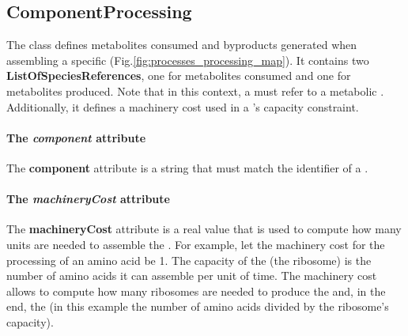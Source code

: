 \subsection{ComponentProcessing}
\label{sec:component_processing}

The \componentprocessing{} class defines metabolites consumed and byproducts
generated when assembling a specific \component{}
(Fig.\ref{fig:processes_processing_map}).
It contains two \textbf{ListOfSpeciesReferences}, one for metabolites
consumed and one for metabolites produced.
Note that in this context, a \speciesreference{} must refer to a
metabolic \species.
Additionally, it defines a machinery cost used in a \machinery{}'s
capacity constraint.

\paragraph{The \textit{component} attribute}
The \textbf{component} attribute is a string that must match the identifier
of a \component{}.

\paragraph{The \textit{machineryCost} attribute}
The \textbf{machineryCost} attribute is a real value that is used to
compute how many \machinery{} units are needed to assemble the \component{}.
For example, let the machinery cost for the processing of an amino acid be 1.
The capacity of the \machinery{} (the ribosome) is the number of amino acids
it can assemble per unit of time.
The machinery cost allows to compute how many ribosomes are needed
to produce the \component{} and, in the end, the \macromolecule{}
(in this example the number of amino acids divided by the ribosome's capacity).
